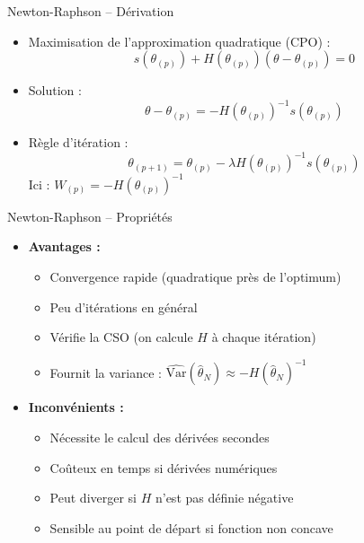 \documentclass[11pt,aspectratio=169]{beamer}
\begin{document}
\begin{frame}{Newton-Raphson -- Dérivation}

\begin{itemize}

\item Maximisation de l'approximation quadratique (CPO) :
  \[
  s(\theta_{(p)}) + H(\theta_{(p)})(\theta - \theta_{(p)}) = 0
  \]

\item Solution :
  \[
  \theta - \theta_{(p)} = -H(\theta_{(p)})^{-1} s(\theta_{(p)})
  \]

\item Règle d'itération :
  \[
  \boxed{\theta_{(p+1)} = \theta_{(p)} - \lambda H(\theta_{(p)})^{-1} s(\theta_{(p)})}
  \]
  Ici : $W_{(p)} = -H(\theta_{(p)})^{-1}$

\end{itemize}

\end{frame}

\begin{frame}{Newton-Raphson -- Propriétés}

\begin{itemize}

\item \textbf{Avantages :}
  \begin{itemize}
    \item Convergence rapide (quadratique près de l'optimum)\newline
    \item Peu d'itérations en général\newline
    \item Vérifie la CSO (on calcule $H$ à chaque itération)\newline
    \item Fournit la variance : $\widehat{\mathrm{Var}}(\hat{\theta}_N) \approx -H(\hat{\theta}_N)^{-1}$\newline
  \end{itemize}

\item \textbf{Inconvénients :}
  \begin{itemize}
    \item Nécessite le calcul des dérivées secondes\newline
    \item Coûteux en temps si dérivées numériques\newline
    \item Peut diverger si $H$ n'est pas définie négative\newline
    \item Sensible au point de départ si fonction non concave
  \end{itemize}

\end{itemize}

\end{frame}
\end{document}
